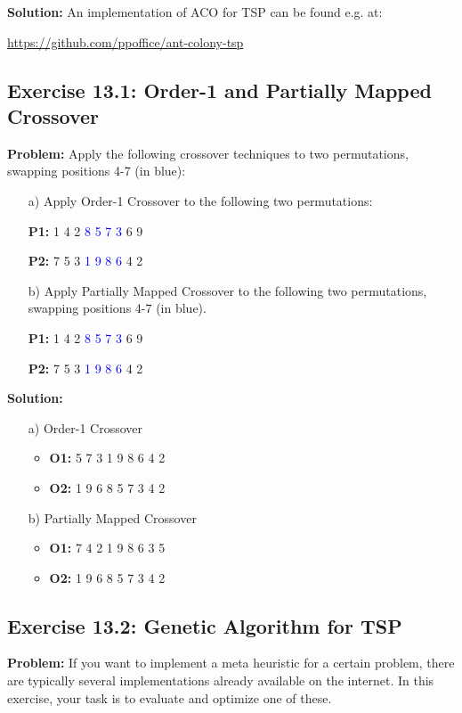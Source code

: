 \textbf{Solution:}
An implementation of ACO for TSP can be found e.g. at:

\url{https://github.com/ppoffice/ant-colony-tsp}

\subsection{Exercise 13.1: Order-1 and Partially Mapped Crossover}
\textbf{Problem:}
Apply the following crossover techniques to two permutations, swapping positions 4-7 (in blue):

\begin{enumerate}
\item[a)] Apply Order-1 Crossover to the following two permutations:

\textbf{P1:} 1 4 2 \textcolor{blue}{8 5 7 3} 6 9

\textbf{P2:} 7 5 3 \textcolor{blue}{1 9 8 6} 4 2

\item[b)] Apply Partially Mapped Crossover to the following two permutations, swapping positions 4-7 (in blue).

\textbf{P1:} 1 4 2 \textcolor{blue}{8 5 7 3} 6 9

\textbf{P2:} 7 5 3 \textcolor{blue}{1 9 8 6} 4 2

\end{enumerate}

\textbf{Solution:}
\begin{enumerate}
\item[a)] Order-1 Crossover
  \begin{itemize}
  \item \textbf{O1:} 5 7 3 1 9 8 6 4 2
  \item \textbf{O2:} 1 9 6 8 5 7 3 4 2
  \end{itemize}
\item[b)] Partially Mapped Crossover
  \begin{itemize}
  \item \textbf{O1:} 7 4 2 1 9 8 6 3 5
  \item \textbf{O2:} 1 9 6 8 5 7 3 4 2
  \end{itemize}
\end{enumerate}

\subsection{Exercise 13.2: Genetic Algorithm for TSP}
\textbf{Problem:}
If you want to implement a meta heuristic for a certain problem, there are typically several implementations already available on the internet. In this exercise, your task is to evaluate and optimize one of these.

